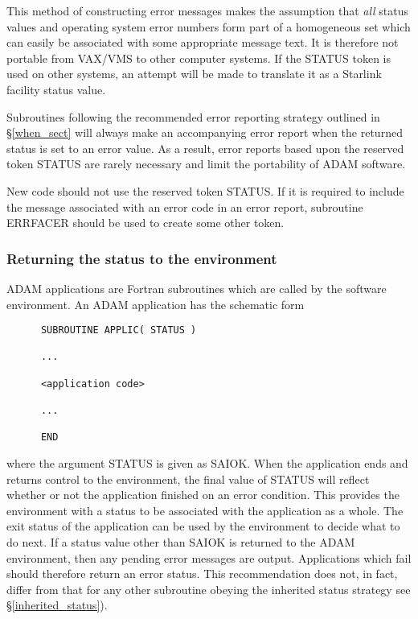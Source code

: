 \documentclass[twoside,11pt]{article}
\newcommand{\htmlref}[2]{#1}
\newcommand{\latex}[1]{#1}
\newcommand{\xlabel}[1]{}
\renewcommand{\_}{\texttt{\symbol{95}}}
\begin{document}
This method of constructing error messages makes the assumption that \emph{all}
status values and operating system error numbers form part of a homogeneous 
set which can easily be associated with some appropriate message text.
It is therefore not portable from VAX/VMS to other computer systems.
If the STATUS token is used on other systems, an attempt will be made to
translate it as a Starlink facility status value.

Subroutines following the
\htmlref{recommended error reporting strategy}{when_sect}
\latex{ outlined in \S\ref{when_sect}} will 
always make an accompanying error report when the returned status is set to an
error value.
As a result, error reports based upon the reserved token STATUS are rarely
necessary and limit the portability of ADAM software.

New code should not use the reserved token STATUS.
If it is required to include the message associated with an error code in an
error report, subroutine
\htmlref{ERR\_FACER}{ERR_FACER} should be used to create some other token.

\subsubsection{\xlabel{returning_the_status_to_the_environment}Returning the status to the environment}
ADAM applications are Fortran subroutines which are called by the software
environment. 
An ADAM application has the schematic form 
\begin {small}
\begin{verbatim}
      SUBROUTINE APPLIC( STATUS )

      ...

      <application code>

      ...

      END
\end{verbatim}
\end {small}

where the argument STATUS is given as SAI\_\_OK. 
When the application ends and returns control to the environment, the final
value of STATUS will reflect whether or not the application finished on an
error condition.
This provides the environment with a status to be associated with the
application as a whole. 
The exit status of the application can be used by the environment to decide
what to do next. 
If a status value other than SAI\_\_OK is returned to the ADAM environment,
then any pending error messages are output. 
Applications which fail should therefore return an error status.
This recommendation does not, in fact, differ from that for any other subroutine
obeying the
\htmlref
{inherited status strategy}{inherited_status}\latex{ see \S\ref{inherited_status})}.
\end{document}
